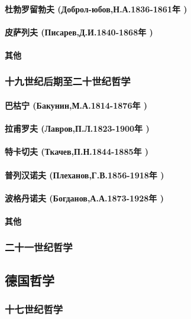 \documentclass[UTF8]{../RepresentationUniverse}
\begin{document}
    \paragraph{杜勃罗留勃夫 (Доброл-юбов,Н.А.1836-1861年 )}
    \paragraph{皮萨列夫 (Писарев,Д.И.1840-1868年 )}
    \paragraph{其他}

\subsubsection{十九世纪后期至二十世纪哲学}
    \paragraph{巴枯宁 (Бакунин,М.А.1814-1876年 )}
    \paragraph{拉甫罗夫 (Лавров,П.Л.1823-1900年 )}
    \paragraph{特卡切夫 (Ткачев,П.Н.1844-1885年 )}
    \paragraph{普列汉诺夫 (Плеханов,Г.В.1856-1918年 )}
    \paragraph{波格丹诺夫 (Богданов,А.А.1873-1928年 )}
    \paragraph{其他}
\subsubsection{二十一世纪哲学}


\subsection{德国哲学}
\subsubsection{十七世纪哲学}
\end{document}
